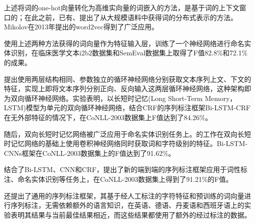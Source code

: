 上述将词的one-hot向量转化为高维实向量的词嵌入的方法，是基于词的上下文窗口的；在此之前，已有\citet{bengio2003neural}、\citet{mikolov2010recurrent}提出了从大规模语料中获得词的分布式表示的方法。Mikolov\citep{mikolov2013distributed, mikolov2013efficient}在2013年提出的word2vec得到了广泛应用。

\citet{wu2015study}使用上述两种方法获得的词向量作为特征输入层，训练了一个神经网络进行命名实体识别，在临床医学文本i2b2数据集和SemEval数据集上取得了F值82.8\%和72.1\%的成果。

\citet{huang2015bidirectional}提出使用两层结构相同、参数独立的循环神经网络分别获取文本序列上文、下文的特征，实现上即将文本序列分别正向、反向输入这两层循环神经网络，这种架构即为双向循环神经网络。实验表明，以长短时记忆(Long Short-Term Memory， LSTM)模型为单元的双向循环神经网络，结合CRF的序列标注框架Bi-LSTM-CRF在无外部特征的情况下，在CoNLL-2003数据集上F值达到了84.26\%。

随后，双向长短时记忆网络被广泛应用于命名实体识别任务上。\citet{chiu2015named}的工作在双向长短时记忆网络的基础上使用卷积神经网络同时获取词和字符级别的特征。Bi-LSTM-CNNs框架在CoNLL-2003数据集上的F值达到了91.62\%。

\citet{ma2016end}结合了Bi-LSTM、CNN和CRF，提出了新的端到端的序列标注框架应用于词性标注、命名实体识别等任务上，在CoNLL-2003数据集上得到了91.21\%的F值。

\citet{lample2016neural}还提出了通用的序列标注框架，其基于经人工标注的字符特征和预训练的词向量进行序列标注，无需依赖额外的语言知识，在英语、德语、丹麦语和西班牙语上的实验表明其结果与当前最佳结果相近，而这些结果都使用了额外的经过标注的数据。

